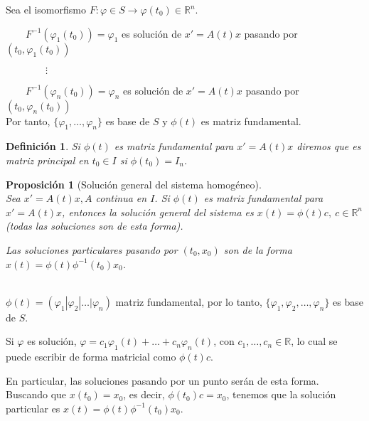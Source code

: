 \documentclass{article}
\makeatletter
\theoremstyle{theorem-style}  %
\newtheorem{proposition}[theorem]{Proposición}
\theoremstyle{definition-style}
\newtheorem{definition}{Definición}[section]
\theoremstyle{example-style}
\renewenvironment{proof}[1][\proofname]{\par
	\pushQED{\qed}%
	\normalfont \topsep6\p@\@plus6\p@\relax
	\list{}{%
		\settowidth{\leftmargin}{\quad:\hskip\labelsep}%
		\setlength{\labelwidth}{0pt}%
		\setlength{\itemindent}{-\leftmargin}%
	}%
	\item[\hskip\labelsep\itshape#1\@addpunct{:}]\ignorespaces
}{%
	\popQED\endlist\@endpefalse
}
\makeatother
\begin{document}
\begin{proof}
\begin{enumerate}
	Sea el isomorfismo $ F:\varphi\in S\longrightarrow \varphi(t_0)\in \mathbb{R}^n $. 
	
	$ \qquad F^{-1}(\varphi_1(t_0))=\varphi_1 $ es solución de $ x'=A(t)x $ pasando por $ (t_0,\varphi_1(t_0)) $ 
	
	$ \qquad \qquad \vdots $ 
	
	$ \qquad F^{-1}(\varphi_n(t_0))=\varphi_n $ es solución de $ x'=A(t)x $ pasando por $ (t_0,\varphi_n(t_0)) $ \\
	Por tanto, $ \{ \varphi_1, \dots, \varphi_n \} $ es base de $ S $ y $ \phi(t) $ es matriz fundamental. 
	\end{enumerate}
\end{proof}
\begin{definition}
	Si $ \phi(t) $ es matriz fundamental para $ x'=A(t)x $ diremos que es \emph{matriz principal en $ t_0$}$\in I $ si $ \phi(t_0)=I_n $.
\end{definition}
\begin{proposition}[Solución general del sistema homogéneo] \ \\
	Sea $ x'= A(t)x, A$ continua en $ I $. Si $ \phi(t) $ es matriz fundamental para $ x'=A(t)x $, entonces la solución general del sistema es $ x(t)=\phi(t)c, \ c\in \mathbb{R}^n $ (todas las soluciones son de esta forma).	
	
	Las soluciones particulares pasando por $ (t_0,x_0) $ son de la forma  $ x(t)=\phi(t)\phi^{-1}(t_0)x_0 $.
\end{proposition}
\begin{proof}\ \\
	$ \phi(t)= (\varphi_1 | \varphi_2 | \dots | \varphi_n) $ matriz fundamental, por lo tanto, $ \{\varphi_1, \varphi_2, \dots,  \varphi_n \} $ es base de $ S $.
	
	Si $ \varphi $ es solución, $ \varphi = c_1\varphi_1(t)+ \dots + c_n \varphi_n(t) $, con $ c_1, \dots, c_n\in \mathbb{R} $, lo cual se puede escribir de forma matricial como $ \phi(t)c $.
	
	En particular, las soluciones pasando por un punto serán de esta forma. Buscando que $ x(t_0)=x_0 $, es decir, $ \phi(t_0)c=x_0 $, tenemos que la solución particular es $ x(t)=\phi(t)\phi^{-1}(t_0)x_0 $.
\end{proof}
\end{document}
